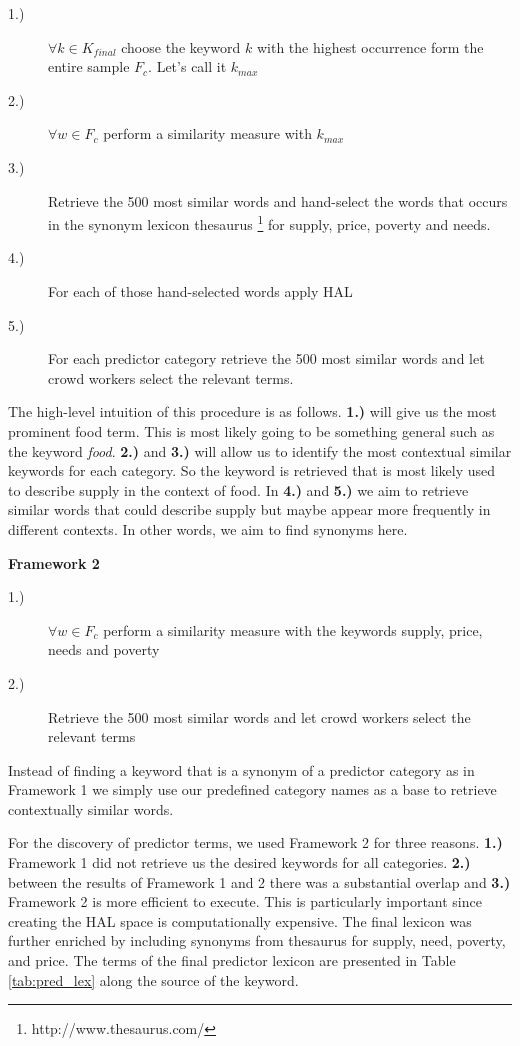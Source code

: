 \begin{description}
  \item[1.)] $\forall k \in K_{final}$ choose the keyword $k$ with the highest occurrence form the entire sample $F_c$. Let's call it $k_{max}$  
  \item[2.)] $\forall w \in F_c $ perform a similarity measure with $k_{max}$
  \item[3.)] Retrieve the 500 most similar words and hand-select the words that occurs in the synonym lexicon thesaurus \footnote{http://www.thesaurus.com/} for supply, price, poverty and needs. 
    \item[4.)] For each of those hand-selected words  apply HAL 
  \item[5.)] For each predictor category retrieve the 500 most similar words and let crowd workers select the relevant terms. 
    \end{description}

The high-level intuition of this procedure is as follows. \textbf{1.)} will give us the most prominent food term. This is most likely going to be something general such as the keyword \emph{food}. \textbf{2.)} and \textbf{3.)} will allow us to identify the most contextual similar keywords for each category. So the keyword is retrieved that is most likely used to describe supply in the context of food. In \textbf{4.)} and \textbf{5.)} we aim to retrieve similar words that could describe supply but maybe appear more frequently in different contexts. In other words, we aim to find synonyms here.   


\textbf{Framework 2}


\begin{description}
   \item[1.)] $\forall w \in F_c $ perform a similarity measure with the keywords supply, price, needs and poverty
  \item[2.)]  Retrieve the 500 most similar words and let crowd workers select the relevant terms  
  \end{description}

Instead of finding a keyword that is a synonym of a predictor category as in Framework 1 we simply use our predefined category names as a base to retrieve contextually similar words. 

For the discovery of predictor terms, we used Framework 2 for three reasons. \textbf{1.)}  Framework 1 did not retrieve us the desired keywords for all categories. \textbf{2.)} between the results of Framework 1 and 2 there was a substantial overlap and \textbf{3.)}  Framework 2 is more efficient to execute. This is particularly important since creating the HAL space is computationally expensive. The final lexicon was further enriched by including synonyms from thesaurus  for supply, need, poverty, and price. The terms of the final predictor lexicon are presented in Table \ref{tab:pred_lex} along the source of the keyword. 


